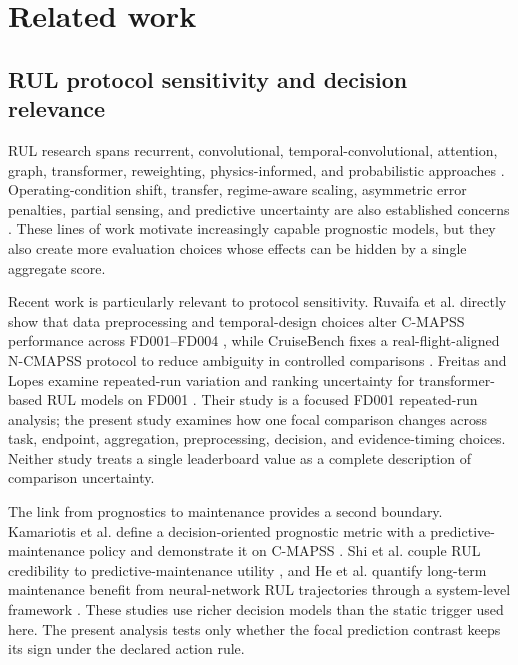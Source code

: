 \documentclass[preprint,12pt,numbers,sort&compress]{elsarticle}
\begin{document}
\section{Related work}\label{sec:related-work}

\subsection{RUL protocol sensitivity and decision relevance}

RUL research spans recurrent, convolutional, temporal-convolutional, attention, graph, transformer, reweighting, physics-informed, and probabilistic approaches \citep{Heimes2008RNN,Hochreiter1997LSTM,Zheng2017LSTM,Babu2016DCNN,Bai2018TCN,Lin2024CATATCN,Wang2024DVGTformer,Kim2024ARRTransformer,Zhou2025PISTHNN}. Operating-condition shift, transfer, regime-aware scaling, asymmetric error penalties, partial sensing, and predictive uncertainty are also established concerns \citep{Zhang2021Transfer,Aasi2026ConditionAware,Chen2021RiskAverseRUL,Liu2021UnsymmetricalRUL,Li2023PartialSensor,Tang2026PartialSensor,Nagaraj2024PIML,Sharma2025UncertaintyAware}. These lines of work motivate increasingly capable prognostic models, but they also create more evaluation choices whose effects can be hidden by a single aggregate score.

Recent work is particularly relevant to protocol sensitivity. Ruvaifa et al. directly show that data preprocessing and temporal-design choices alter C-MAPSS performance across FD001--FD004 \citep{Ruvaifa2026Preprocessing}, while CruiseBench fixes a real-flight-aligned N-CMAPSS protocol to reduce ambiguity in controlled comparisons \citep{Cheng2026CruiseBench}. Freitas and Lopes examine repeated-run variation and ranking uncertainty for transformer-based RUL models on FD001 \citep{FreitasLopes2026TransformerRUL}. Their study is a focused FD001 repeated-run analysis; the present study examines how one focal comparison changes across task, endpoint, aggregation, preprocessing, decision, and evidence-timing choices. Neither study treats a single leaderboard value as a complete description of comparison uncertainty.

The link from prognostics to maintenance provides a second boundary. Kamariotis et al. define a decision-oriented prognostic metric with a predictive-maintenance policy and demonstrate it on C-MAPSS \citep{Kamariotis2024DecisionMetric}. Shi et al. couple RUL credibility to predictive-maintenance utility \citep{Shi2025CredibilityPdM}, and He et al. quantify long-term maintenance benefit from neural-network RUL trajectories through a system-level framework \citep{He2026MaintenanceBenefit}. These studies use richer decision models than the static trigger used here. The present analysis tests only whether the focal prediction contrast keeps its sign under the declared action rule.
\end{document}
